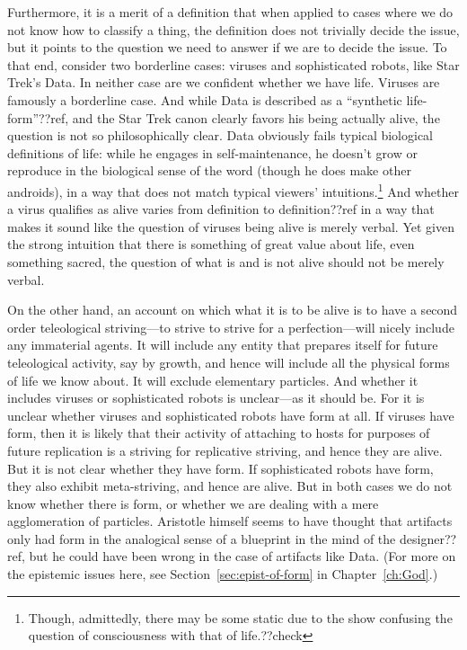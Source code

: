 Furthermore, it is a merit of a definition that when applied to cases where we do not know how to classify a thing, the definition does not trivially
decide the issue, but it points to the question we need to answer if we are to decide the issue. To that end, consider two borderline cases: viruses
and sophisticated robots, like Star Trek's Data. In neither case are we confident whether we have life. Viruses are famously a borderline case.
And while Data is described as a ``synthetic life-form''??ref, and the Star Trek canon clearly favors his being actually alive, the question is
not so philosophically clear. Data obviously fails typical biological definitions of life: while he engages in self-maintenance, he doesn't grow or
reproduce in the biological sense of the word (though he does make other androids), in a way that does not match typical viewers' intuitions.\footnote{Though,
admittedly, there may be some static due to the show confusing the question of consciousness with that of life.??check} And 
whether a virus qualifies as alive varies from definition
to definition??ref in a way that makes it sound like the question of viruses being alive is merely verbal. Yet given the strong intuition that there
is something of great value about life, even something sacred, the question of what is and is not alive should not be merely verbal. 

On the other hand, an account on which what it is to be alive is to have a second order teleological striving---to strive to strive for a perfection---will nicely 
include any immaterial agents. It will include any entity that prepares itself for future teleological activity, say by growth,
and hence will include all the physical forms of life we know about. It will exclude elementary particles. And whether it includes viruses or sophisticated
robots is unclear---as it should be. For it is unclear whether viruses and sophisticated robots have form at all. If viruses have form, then it is likely
that their activity of attaching to hosts for purposes of future replication is a striving for replicative striving, and hence they are alive. But it is
not clear whether they have form. If sophisticated robots have form, they also exhibit meta-striving, and hence are alive. But in both cases we do not
know whether there is form, or whether we are dealing with a mere agglomeration of particles. 
Aristotle himself seems to have thought that
artifacts only had form in the analogical sense of a blueprint in the mind of the designer??ref, but he could have been wrong in the case of artifacts like Data.
(For more on the epistemic issues here, see Section~\ref{sec:epist-of-form}
in Chapter~\ref{ch:God}.) 

